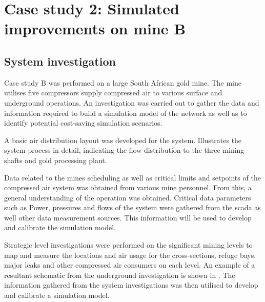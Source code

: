 \section{Case study 2: Simulated improvements on mine B}
	\subsection{System investigation}
	Case study B was performed on a large South African gold mine. The mine utilises five compressors supply compressed air to various surface and underground operations. An investigation was carried out to gather the data and information required to build a simulation model of the network as well as to identify potential cost-saving simulation scenarios.
	\par 
	A basic air distribution layout was developed for the system.  Illustrates the system process in detail, indicating the flow distribution to the three mining shafts and gold processing plant.
	\par 
	Data related to the mines scheduling as well as critical limits and setpoints of the compressed air system was obtained from various mine personnel. From this, a general understanding of the operation was obtained.  Critical data parameters such as Power, pressures and flows of the system were gathered from the \gls{scada} as well other data measurement sources. This information will be used to develop and calibrate the simulation model.
	\par 
	Strategic level investigations were performed on the significant mining levels to map and measure the locations and air usage for the cross-sections, refuge bays, major leaks and other compressed air consumers on each level. An example of a resultant schematic from the underground investigation is shown in . The information gathered from the system investigations was then utilised to develop and calibrate a simulation model.
